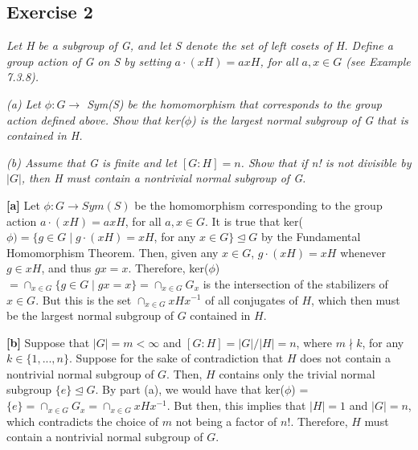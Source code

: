 \subsection*{Exercise 2}
\textit{Let H be a subgroup of G, and let S denote the set of left cosets of H. Define a group action of G on S by setting $a\cdot(xH) = axH$, for all $a,x \in G$ (see Example 7.3.8).}

\textit{(a) Let $\phi: G \rightarrow$ Sym(S) be the homomorphism that corresponds to the group action defined above. Show that ker($\phi$) is the largest normal subgroup of G that is contained in H.}

\textit{(b) Assume that G is finite and let $[G:H] = n$. Show that if n! is not divisible by $|G|$, then H must contain a nontrivial normal subgroup of G.}

\vspace{5 mm}
\textbf{[a]} Let $\phi: G \rightarrow Sym(S)$ be the homomorphism corresponding to the group action $a\cdot(xH) = axH$, for all $a,x \in G$. It is true that ker($\phi) = \{g \in G \mid g\cdot(xH) = xH$, for any $x \in G\} \trianglelefteq G$ by the Fundamental Homomorphism Theorem. Then, given any $x \in G$, $g\cdot(xH) = xH$ whenever $g \in xH$, and thus $gx = x$. Therefore, ker($\phi$) $= \cap_{x \in G} \{g \in G \mid gx = x\} = \cap_{x \in G}G_x$ is the intersection of the stabilizers of $x \in G$. But this is the set $\cap_{x \in G} xHx^{-1}$ of all conjugates of $H$, which then must be the largest normal subgroup of $G$ contained in $H$.

\vspace{5 mm}
\textbf{[b]} Suppose that $|G| = m < \infty$ and $[G:H] = |G|/|H| = n$, where $m \nmid k$, for any $k \in \{1,...,n\}$. Suppose for the sake of contradiction that $H$ does not contain a nontrivial normal subgroup of $G$. Then, $H$ contains only the trivial normal subgroup $\{e\} \trianglelefteq G$. By part (a), we would have that ker($\phi$) = $\{e\} = \cap_{x \in G}G_x = \cap_{x \in G} xHx^{-1}$. But then, this implies that $|H| = 1$ and $|G| = n$, which contradicts the choice of $m$ not being a factor of $n!$. Therefore, $H$ must contain a nontrivial normal subgroup of $G$.
